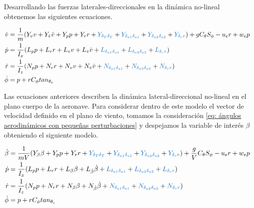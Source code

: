 Desarrollando las fuerzas laterales-direccionales en la dinámica no-lineal obtenemos las siguientes ecuaciones. 

\begin{align}
    \dot v & = \frac{1}{m}(Y_{v} v + Y_{\dot v}\dot v + Y_{p}p + Y_{r} r + \textcolor{RoyalBlue}{Y_{\delta_{T} \delta_{T}}} + \textcolor{RoyalBlue}{Y_{\delta_{a1} \delta_{a1}}} + \textcolor{RoyalBlue}{Y_{\delta_{a2} \delta_{a2}}}  + \textcolor{RoyalBlue}{Y_{\delta_{r}r}}) + gC_{\theta}S_{\phi} - u_{e}r + w_{e}p  \\
    \dot p & = \frac{1}{I_x}(L_{p}p + L_{r}r + L_{v}v + L_{\dot v}\dot v + \textcolor{RoyalBlue}{L_{\delta_{a1} \delta_{a1}}} + \textcolor{RoyalBlue}{L_{\delta_{a2} \delta_{a2}}}  + \textcolor{RoyalBlue}{L_{\delta_{r}r}}) \\
    \dot r & = \frac{1}{I_z}(N_{p}p + N_{r}r + N_{v}v + N_{\dot v}\dot v + \textcolor{RoyalBlue}{N_{\delta_{a1} \delta_{a1}}} + \textcolor{RoyalBlue}{N_{\delta_{a2} \delta_{a2}}}  + \textcolor{RoyalBlue}{N_{\delta_{r}r}})\\
    \dot \phi &= p + r C_{\phi} tan_{\theta_{e}}
\end{align}

Las ecuaciones anteriores describen la dinámica lateral-direccional no-lineal en el plano cuerpo de la aeronave. Para considerar dentro de este modelo el vector de velocidad definido en el plano de viento, tomamos la consideración  \ref{eq: ángulos aerodinámicos con pequeñas perturbaciones} y despejamos la variable de interés $\beta$ obteniendo el siguiente modelo. 

\begin{align}
    \dot \beta & = \frac{1}{mV}(Y_{\beta} \beta + Y_{p}p + Y_{r} r +   \textcolor{RoyalBlue}{Y_{\delta_{T} \delta_{T}}} + \textcolor{RoyalBlue}{Y_{\delta_{a1} \delta_{a1}}} + \textcolor{RoyalBlue}{Y_{\delta_{a2} \delta_{a2}}}  + \textcolor{RoyalBlue}{Y_{\delta_{r}r}}) + \frac{g}{V}C_{\theta}S_{\phi} - u_{e}r + w_{e}p  \\
    \dot p & = \frac{1}{I_x}(L_{p}p + L_{r}r + L_{\beta}\beta + L_{\dot \beta}\dot \beta + \textcolor{RoyalBlue}{L_{\delta_{a1} \delta_{a1}}} + \textcolor{RoyalBlue}{L_{\delta_{a2} \delta_{a2}}}  + \textcolor{RoyalBlue}{L_{\delta_{r}r}}) \\
    \dot r & = \frac{1}{I_z}(N_{p}p + N_{r}r + N_{\beta}\beta + N_{\dot \beta}\dot \beta + \textcolor{RoyalBlue}{N_{\delta_{a1} \delta_{a1}}} + \textcolor{RoyalBlue}{N_{\delta_{a2} \delta_{a2}}}  + \textcolor{RoyalBlue}{N_{\delta_{r}r}})\\
    \dot \phi &= p + r C_{\phi} tan_{\theta_{e}}
\end{align}


